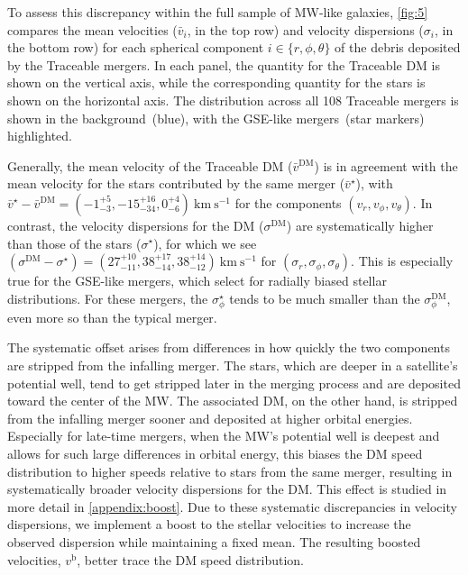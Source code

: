 \documentclass[twocolumn,tighten,twocolappendix]{aastex701}
\newcommand{\kms}{\ensuremath{\text{km}~\text{s}^{-1}}}
\begin{document}
To assess this discrepancy within the full sample of MW-like galaxies, \autoref{fig:5} compares the mean velocities ($\bar{v}_i$, in the top row) and velocity dispersions ($\sigma_i$, in the bottom row) for each spherical component $i\in\{r, \phi, \theta\}$ of the debris deposited by the Traceable mergers. In each panel, the quantity for the Traceable DM is shown on the vertical axis, while the corresponding quantity for the stars is shown on the horizontal axis. The distribution across all 108 Traceable mergers is shown in the background~(blue), with the GSE-like mergers~(star markers) highlighted.

Generally, the mean velocity of the Traceable DM ($\bar{v}^\mathrm{DM}$) is in agreement with the mean velocity for the stars contributed by the same merger ($\bar{v}^\star$), with $\bar{v}^\star - \bar{v}^\mathrm{DM} = (-1^{+5}_{-3}, -15^{+16}_{-34}, 0^{+4}_{-6})~\kms{}$ for the components $(v_r, v_\phi, v_\theta)$. In contrast, the velocity dispersions for the DM ($\sigma^\mathrm{DM}$) are systematically higher than those of the stars ($\sigma^\star$), for which we see $(\sigma^\text{DM} - \sigma^\star) = (27^{+10}_{-11}, 38^{+17}_{-14}, 38^{+14}_{-12})~\kms{}$ for $(\sigma_r, \sigma_\phi, \sigma_\theta)$. This is especially true for the GSE-like mergers, which select for radially biased stellar distributions. For these mergers, the $\sigma_\phi^\star$ tends to be much smaller than the $\sigma_\phi^{\mathrm{DM}}$, even more so than the typical merger.

The systematic offset arises from differences in how quickly the two components are stripped from the infalling merger. The stars, which are deeper in a satellite's potential well, tend to get stripped later in the merging process and are deposited toward the center of the MW. The associated DM, on the other hand, is stripped from the infalling merger sooner and deposited at higher orbital energies. Especially for late-time mergers, when the MW's potential well is deepest and allows for such large differences in orbital energy, this biases the DM speed distribution to higher speeds relative to stars from the same merger, resulting in systematically broader velocity dispersions for the DM. This effect is studied in more detail in \autoref{appendix:boost}.
Due to these systematic discrepancies in velocity dispersions, we implement a boost to the stellar velocities to increase the observed dispersion while maintaining a fixed mean. The resulting boosted velocities, $v^\text{b}$, better trace the DM speed distribution.
\end{document}
